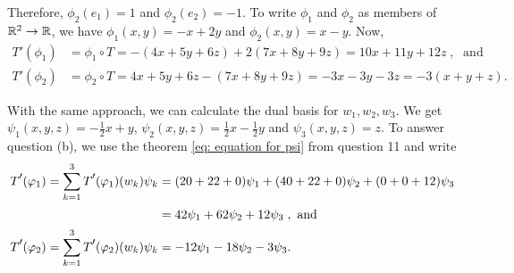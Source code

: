 \begin{xrcs}
\begin{xsol}
    Therefore, $\phi_2(e_1) = 1$ and $\phi_2(e_2) = -1$. To write $\phi_1$ and $\phi_2$ as members of $\mathbb{R}^2 \to \mathbb{R}$, we have $\phi_1(x,y) = -x + 2y$ and $\phi_2 (x,y) = x-y$. Now,
    \begin{equation}
      \begin{aligned}
        T'(\phi_1) &= \phi_1 \circ T = -(4x + 5y + 6z) + 2          (7x + 8y + 9z) = 10x + 11y + 12z \; , \;  \text{ and }  \\
        T'(\phi_2) &= \phi_2 \circ T = 4x + 5y + 6z - (7x + 8y + 9z) = -3x -3y -3z = -3(x+y+z).
      \end{aligned}
    \end{equation}

    With the same approach, we can calculate the dual basis for $w_1, w_2, w_3$. We get $\psi_1(x,y,z) = -\frac{1}{2}x + y$, $\psi_2(x,y,z) = \frac{1}{2}x - \frac{1}{2}y$ and $\psi_3(x,y,z) = z$. To answer question (b), we use the theorem \eqref{eq: equation for psi} from question 11 and write
    \begin{equation}
      \begin{aligned}
        \dual{T} (\varphi_1) =  \sum_{k=1}^{3} \dual{T} (\varphi_1) (w_k) \psi_k &= (20+22+0) \psi_1 + (40+22+0) \psi_2 + (0+0+12 )\psi_3 \\
        & = 42 \psi_1 + 62 \psi_2 + 12 \psi_3  \; , \text{ and }  \\
        \dual{T} (\varphi_2) =  \sum_{k=1}^{3} \dual{T} (\varphi_2) (w_k) \psi_k &= -12 \psi_1 -18 \psi_2 -3 \psi_3. \;
      \end{aligned}
    \end{equation}
  \end{xsol}
\end{xrcs}

